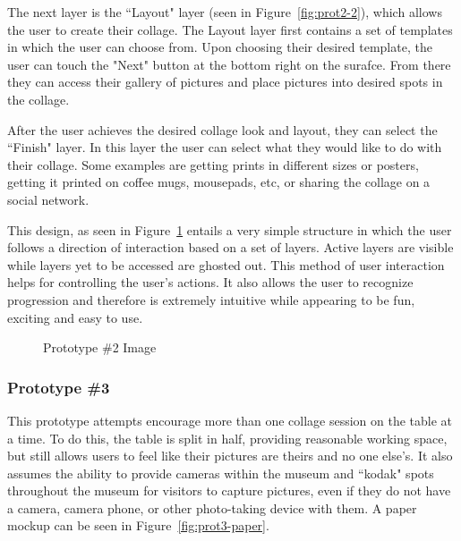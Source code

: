 \documentclass{tei2013}
\begin{document}
The next layer is the ``Layout" layer (seen in Figure~\ref{fig:prot2-2}), which allows the user to create their collage. The Layout layer first contains a set of templates in which the user can choose from. Upon choosing their desired template, the user can touch the "Next" button at the bottom right on the surafce. From there they can access their gallery of pictures and place pictures into desired spots in the collage. 

After the user achieves the desired collage look and layout, they can select the ``Finish" layer. In this layer the user can select what they would like to do with their collage. Some examples are getting prints in different sizes or posters, getting it printed on coffee mugs, mousepads, etc, or sharing the collage on a social network. 

This design, as seen in Figure~\ref{fig:prot2} entails a very simple structure in which the user follows a direction of interaction based on a set of layers. Active layers are visible while layers yet to be accessed are ghosted out. This method of user interaction helps for controlling the user's actions. It also allows the user to recognize progression and therefore is extremely intuitive while appearing to be fun, exciting and easy to use. 

\begin{figure}[ht]
\centering
{}
\caption{Prototype \#2 Image}
\label{fig:prot2}
\end{figure}

\subsubsection{Prototype \#3}
This prototype attempts encourage more than one collage session on the table at a time.  To do this, the table is split in half, providing reasonable working space, but still allows users to feel like their pictures are theirs and no one else's.  It also assumes the ability to provide cameras within the museum and ``kodak" spots throughout the museum for visitors to capture pictures, even if they do not have a camera, camera phone, or other photo-taking device with them.  A paper mockup can be seen in Figure~\ref{fig:prot3-paper}.
\end{document}
